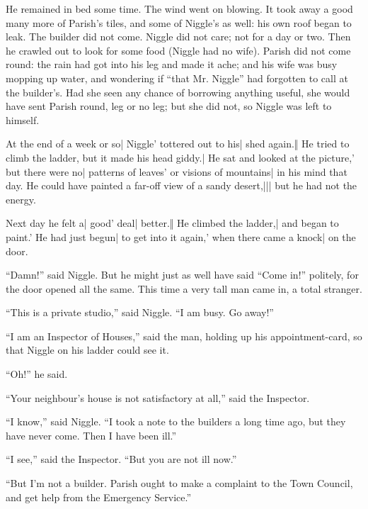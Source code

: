 He remained in bed some time. The wind went on blowing. It took away a good many more of Parish’s tiles, and some of Niggle’s as well: his own roof began to leak. The builder did not come. Niggle did not care; not for a day or two. Then he crawled out to look for some food (Niggle had no wife). Parish did not come round: the rain had got into his leg and made it ache; and his wife was busy mopping up water, and wondering if “that Mr. Niggle” had forgotten to call at the builder’s. Had she seen any chance of borrowing anything useful, she would have sent Parish round, leg or no leg; but she did not, so Niggle was left to himself.


\begin{itemize}
\halfone At the end of a week or so| Niggle' tottered out to his| shed again.‖ He tried to climb the ladder, but it made his head giddy.| He sat and looked at the picture,' but there were no| patterns of leaves' or visions of mountains| in his mind that day.
\quarterfour He could have painted a far-off view of a sandy desert,||| but he had not the energy.
\end{itemize}

\begin{itemize}
\halfone Next day he felt a| good' deal| better.‖ He climbed the ladder,| and began to paint.' He had just begun| to get into it again,' when there came a knock| on the door.
\end{itemize}

“Damn!” said Niggle. But he might just as well have said “Come in!” politely, for the door opened all the same. This time a very tall man came in, a total stranger.

“This is a private studio,” said Niggle. “I am busy. Go away!”

“I am an Inspector of Houses,” said the man, holding up his appointment-card, so that Niggle on his ladder could see it.

“Oh!” he said.

“Your neighbour’s house is not satisfactory at all,” said the Inspector.

“I know,” said Niggle. “I took a note to the builders a long time ago, but they have never come. Then I have been ill.”

“I see,” said the Inspector. “But you are not ill now.”

“But I’m not a builder. Parish ought to make a complaint to the Town Council, and get help from the Emergency Service.”


